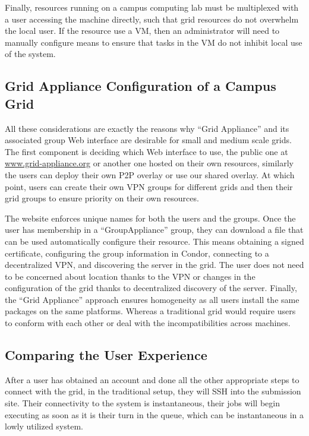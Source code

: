 \documentclass[conference]{IEEEtran}
\begin{document}
Finally, resources running on a campus computing lab must be multiplexed with a
user accessing the machine directly, such that grid resources do not overwhelm
the local user.  If the resource use a VM, then an administrator will need to
manually configure means to ensure that tasks in the VM do not inhibit local
use of the system.

\subsection{Grid Appliance Configuration of a Campus Grid}

All these considerations are exactly the reasons why ``Grid Appliance'' and its
associated group Web interface are desirable for small and medium scale grids.
The first component is deciding which Web interface to use, the public one at
\url{www.grid-appliance.org} or another one hosted on their own resources,
similarly the users can deploy their own P2P overlay or use our shared overlay.
At which point, users can create their own VPN groups for different grids and
then their grid groups to ensure priority on their own resources.

The website enforces unique names for both the users and the groups.  Once the
user has membership in a ``GroupAppliance'' group, they can download a file
that can be used automatically configure their resource.  This means obtaining
a signed certificate, configuring the group information in Condor, connecting
to a decentralized VPN, and discovering the server in the grid.  The user does
not need to be concerned about location thanks to the VPN or changes in the
configuration of the grid thanks to decentralized discovery of the server.
Finally, the ``Grid Appliance'' approach ensures homogeneity as all users
install the same packages on the same platforms.  Whereas a traditional grid
would require users to conform with each other or deal with the
incompatibilities across machines.

\subsection{Comparing the User Experience}

After a user has obtained an account and done all the other appropriate steps
to connect with the grid, in the traditional setup, they will SSH into the
submission site.  Their connectivity to the system is instantaneous, their jobs
will begin executing as soon as it is their turn in the queue, which can be
instantaneous in a lowly utilized system.
\end{document}
